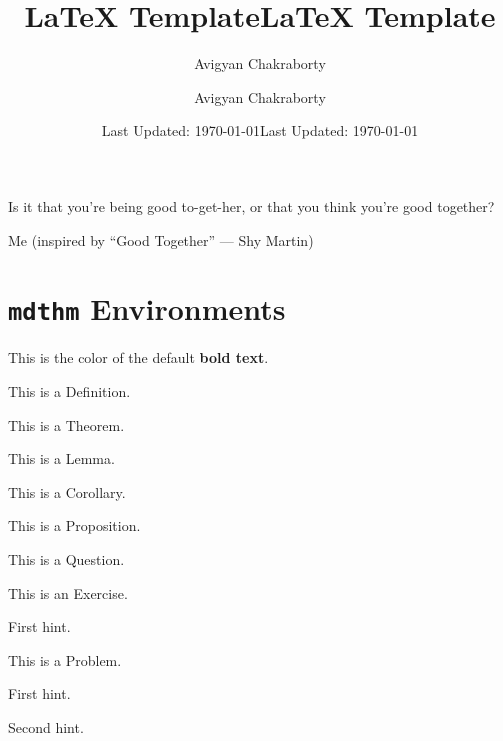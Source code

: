 \documentclass[12pt]{scrartcl}
\title{\textcolor{bubured}{LaTeX Template}}
\author{\textcolor{bubupink}{Avigyan Chakraborty}}
\date{\textcolor{bubucream}{Last Updated: \today}}
\begin{document}
\maketitle

\title{LaTeX Template}
\author{Avigyan Chakraborty}
\date{Last Updated: \today}

\epigraph{Is it that you're being good to-get-her,
or that you think you're good
together?}{Me (inspired
by “Good Together” --- Shy Martin)}

\tableofcontents

\newpage


\section{\texttt{mdthm} Environments}


This is the color of the default \textbf{bold text}.

\begin{definition}
[Name]
This is a Definition.
\end{definition}

\begin{theorem}
[Name]
This is a Theorem.
\end{theorem}

\begin{lemma}
[Name]
This is a Lemma.
\end{lemma}

\begin{corollary}
[Name]
This is a Corollary.
\end{corollary}

\begin{proposition}
[Name]
This is a Proposition.
\end{proposition}

\begin{ques}
[Name]
This is a Question.
\end{ques}

\begin{exercise}
[Name]
This is an Exercise.
\end{exercise}
\begin{hints}
  \begin{hint}
    First hint.
  \end{hint}
\end{hints}

\begin{problem}
[Name]
This is a Problem.
\end{problem}
\begin{hints}
  \begin{hint}
    First hint.
  \end{hint}
  \begin{hint}
    Second hint.
  \end{hint}
\end{hints}
\end{document}
